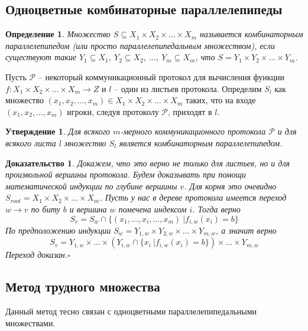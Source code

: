 \documentclass[a4paper]{article}
\newtheorem*{mdefinition}{Определение}
\newtheorem*{msolution}{Доказательство}
\newtheorem{mclaim}{Утверждение}[section]
\begin{document}
\subsection{Одноцветные комбинаторные параллелепипеды}
\begin{mdefinition}
	Множество $S \subseteq X_1\times X_2\times \ldots\times X_m$ называется комбинаторным параллелепипедом (или просто параллелепипедальным
	множеством), если существуют такие $Y_1 \subseteq X_1,\ Y_2 \subseteq X_2,\ \ldots,\ Y_m \subseteq X_m$, что $S = Y_1\times Y_2\times \ldots\times Y_m$.
\end{mdefinition}

Пусть $\mathcal{P}$ -- некоторый коммуникационный протокол для вычисления функции $f:X_1\times X_2\times \ldots\times X_m\rightarrow Z$ 
и $l$ -- один из листьев протокола. Определим $S_l$ как множество $(x_1, x_2, \ldots, x_m) \in X_1\times X_2\times \ldots\times X_m$ таких, что 
на входе $(x_1,x_2, \ldots, x_m)$ игроки, следуя протоколу $\mathcal{P}$, приходят в $l$.

\begin{mclaim}
    Для всякого $m$-мерного коммуникационного протокола $\mathcal{P}$ и для всякого листа $l$ множество $S_l$
    является комбинаторным параллелепипедом. 
\end{mclaim}

\begin{msolution}
     Докажем, что это верно не только для листьев, но и для произвольной вершины протокола. Будем 
     доказывать при помощи математической индукции по глубине вершины $v$. Для корня это очевидно 
     $S_{root} = X_1\times X_2\times \ldots\times X_m$. Пусть у нас в дереве протокола имеется 
     переход $w\rightarrow v$ по биту $b$ и вершина $w$ помечена индексом $i$. Тогда верно 
     $$S_v = S_w \cap \{(x_1,\ldots,x_i,\ldots,x_m)\ | f_{i,w}(x_i) = b\}$$ По предположению индукции 
     $S_w = Y_{1,w}\times Y_{2,w}\times \ldots\times Y_{m,w}$, а значит верно $$S_v = Y_{1,w}
     \times\ldots\times(Y_{i,w}\cap\{x_i\ | f_{i,w}(x_i) = b\})\times \ldots\times Y_{m,w}$$
     Переход доказан.$\square$
\end{msolution}

\subsection{Метод трудного множества}

Данный метод тесно связан с одноцветными параллелепипедальными множествами.
\end{document}
